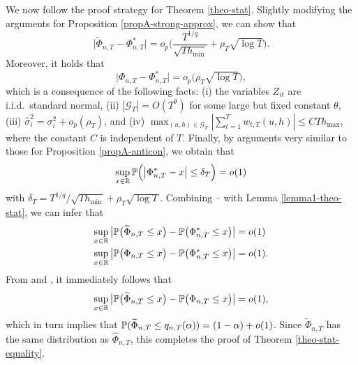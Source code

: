 \documentclass[a4paper,12pt]{article}
\makeatletter
\renewcommand{\eqref}[1]{\tagform@{\ref{#1}}}
\makeatother
\begin{document}
We now follow the proof strategy for Theorem \ref{theo-stat}. Slightly modifying the arguments for Proposition \ref{propA-strong-approx}, we can show that 
\begin{equation}\label{eq-theo-stat-equality-res1}
\big| \widetilde{\Phi}_{n,T} - \Phi_{n,T}^* \big| = o_p \Big( \frac{T^{1/q}}{\sqrt{T h_{\min}}} + \rho_T \sqrt{\log T} \Big). 
\end{equation}
Moreover, it holds that 
\begin{equation}\label{eq-theo-stat-equality-res2}
\big| \Phi_{n,T} - \Phi_{n,T}^* \big| = o_p \big( \rho_T \sqrt{\log T} \big), 
\end{equation}
which is a consequence of the following facts: (i) the variables $Z_{it}$ are i.i.d.\ standard normal, (ii) $|\mathcal{G}_T| = O(T^\theta)$ for some large but fixed constant $\theta$, (iii) $\widehat{\sigma}_i^2 = \sigma_i^2 + o_p(\rho_T)$, and (iv) $\max_{(u,h) \in \mathcal{G}_T} | \sum_{t=1}^T w_{t,T}(u,h) | \le C T h_{\max}$, where the constant $C$ is independent of $T$. Finally, by arguments very similar to those for Proposition \ref{propA-anticon}, we obtain that 
\begin{equation}\label{eq-theo-stat-equality-res3}
\sup_{x \in \mathbb{R}} \mathbb{P} \Big( \big| \Phi_{n,T}^* - x \big| \le \delta_T \Big) = o(1) 
\end{equation}
with $\delta_T = T^{1/q} / \sqrt{T h_{\min}} + \rho_T \sqrt{\log T}$. Combining \eqref{eq-theo-stat-equality-res1}--\eqref{eq-theo-stat-equality-res3} with Lemma \ref{lemma1-theo-stat}, we can infer that 
\begin{align}
\sup_{x \in \mathbb{R}} \big| \mathbb{P} \big( \widetilde{\Phi}_{n,T} \le x \big) -  \mathbb{P} \big( \Phi_{n,T}^* \le x \big) \big| & = o(1) \label{eq-theo-stat-equality-res4} \\
\sup_{x \in \mathbb{R}} \big| \mathbb{P} \big( \Phi_{n,T} \le x \big) -  \mathbb{P} \big( \Phi_{n,T}^* \le x \big) \big| & = o(1). \label{eq-theo-stat-equality-res5}
\end{align}
From \eqref{eq-theo-stat-equality-res4} and \eqref{eq-theo-stat-equality-res5}, it immediately follows that 
\[ \sup_{x \in \mathbb{R}} \big| \mathbb{P} \big( \widetilde{\Phi}_{n,T} \le x \big) -  \mathbb{P} \big( \Phi_{n,T} \le x \big) \big| = o(1), \]
which in turn implies that $\mathbb{P} ( \widetilde{\Phi}_{n,T} \le q_{n,T}(\alpha) ) = (1 - \alpha) + o(1)$. Since $\widetilde{\Phi}_{n,T}$ has the same distribution as $\widehat{\Phi}_{n,T}$, this completes the proof of Theorem \ref{theo-stat-equality}. 
\end{document}
